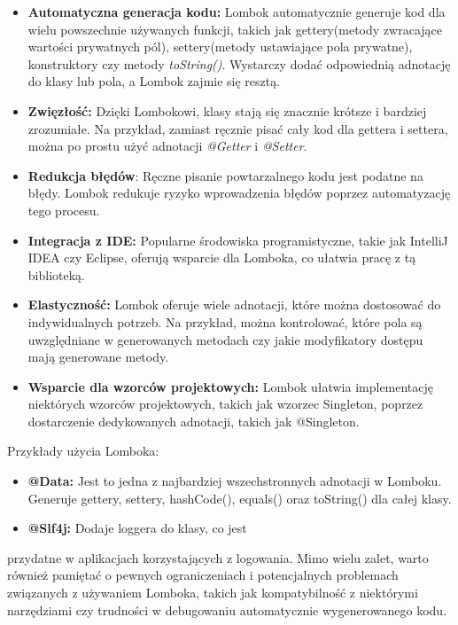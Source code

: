 \begin{itemize}
\item \textbf{Automatyczna generacja kodu:} Lombok automatycznie generuje kod dla wielu powszechnie używanych funkcji, takich jak gettery(metody zwracające wartości prywatnych pól), settery(metody ustawiające pola prywatne), konstruktory czy metody \textit{toString()}. Wystarczy dodać odpowiednią adnotację do klasy lub pola, a Lombok zajmie się resztą.

\item \textbf{Zwięzłość:} Dzięki Lombokowi, klasy stają się znacznie krótsze i bardziej zrozumiałe. Na przykład, zamiast ręcznie pisać cały kod dla gettera i settera, można po prostu użyć adnotacji \textit{@Getter} i \textit{@Setter}.

\item \textbf{Redukcja błędów}: Ręczne pisanie powtarzalnego kodu jest podatne na błędy. Lombok redukuje ryzyko wprowadzenia błędów poprzez automatyzację tego procesu.

\item \textbf{Integracja z IDE:} Popularne środowiska programistyczne, takie jak IntelliJ IDEA czy Eclipse, oferują wsparcie dla Lomboka, co ułatwia pracę z tą biblioteką.

\item \textbf{Elastyczność:} Lombok oferuje wiele adnotacji, które można dostosować do indywidualnych potrzeb. Na przykład, można kontrolować, które pola są uwzględniane w generowanych metodach czy jakie modyfikatory dostępu mają generowane metody.

\item \textbf{Wsparcie dla wzorców projektowych:} Lombok ułatwia implementację niektórych wzorców projektowych, takich jak wzorzec Singleton, poprzez dostarczenie dedykowanych adnotacji, takich jak @Singleton.
\end{itemize}

Przykłady użycia Lomboka:

\begin{itemize}
\item \textbf{@Data:} Jest to jedna z najbardziej wszechstronnych adnotacji w Lomboku. Generuje gettery, settery, hashCode(), equals() oraz toString() dla całej klasy.
\item \textbf{@Slf4j:} Dodaje loggera do klasy, co jest
\end{itemize} przydatne w aplikacjach korzystających z logowania.
Mimo wielu zalet, warto również pamiętać o pewnych ograniczeniach i potencjalnych problemach związanych z używaniem Lomboka, takich jak kompatybilność z niektórymi narzędziami czy trudności w debugowaniu automatycznie wygenerowanego kodu\cite{lombokSpecs}.

